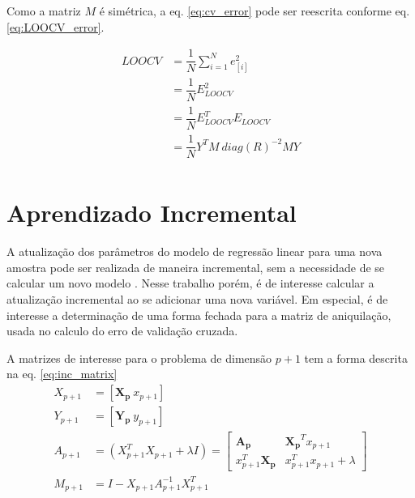 Como a matriz $M$ é simétrica, a eq. \ref{eq:cv_error} pode ser reescrita conforme eq. \ref{eq:LOOCV_error}.

\begin{equation}
    \begin{split}
        LOOCV   &= \dfrac{1}{N} \sum_{i=1}^{N}e^2_{[i]} \\
                &= \dfrac{1}{N} E_{LOOCV}^2 \\
                &= \dfrac{1}{N}E_{LOOCV}^TE_{LOOCV} \\
                &= \dfrac{1}{N} Y^TM\ diag(R)^{-2}MY \\
    \end{split}
    \label{eq:LOOCV_error}
\end{equation}


\section{Aprendizado Incremental}

A atualização dos parâmetros do modelo de regressão linear para uma nova amostra pode ser realizada de maneira 
incremental, sem a necessidade de se calcular um novo modelo \cite{mit_onlinereg}. Nesse trabalho porém, é de 
interesse calcular a atualização incremental ao se adicionar uma nova variável. Em especial, é de 
interesse a determinação de uma forma fechada para a matriz de aniquilação, usada no calculo do erro de 
validação cruzada.

A matrizes de interesse para o problema de dimensão $p+1$ tem a forma descrita na eq. \ref{eq:inc_matrix} 
\begin{equation}
    \begin{split}
    X_{p+1} &= \left[\mathbf{X_p}\ x_{p+1}\right] \\
    Y_{p+1} &= \left[\mathbf{Y_p}\ y_{p+1}\right] \\
    A_{p+1} &= (X_{p+1}^T X_{p+1} + \lambda I ) = 
    \begin{bmatrix}
        \mathbf{A_p} & \mathbf{X_p}^T x_{p+1} \\
        x_{p+1}^T \mathbf{X_p} & x_{p+1}^T x_{p+1} + \lambda
    \end{bmatrix}  \\
    M_{p+1} &= I - X_{p+1} A_{p+1}^{-1} X_{p+1}^T \\ 
    \end{split}  
    \label{eq:inc_matrix}
\end{equation}

